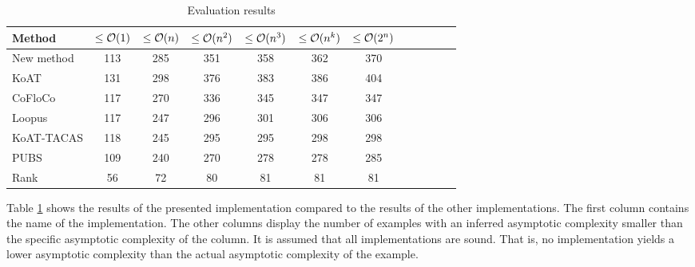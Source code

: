 \begin{table}
  \begin{center}
    \label{tab:evaluation}
    \begin{tabular}{l|c|c|c|c|c|c|c|c|c|c|c}
      Method & $\leq\mathcal{O}(1)$ & $\leq\mathcal{O}(n)$ & $\leq\mathcal{O}(n^2)$ & $\leq\mathcal{O}(n^3)$ & $\leq\mathcal{O}(n^k)$ & $\leq\mathcal{O}(2^n)$\\
      \hline
      New method & 113 & 285 & 351 & 358 & 362 & 370 \\
      KoAT       & 131 & 298 & 376 & 383 & 386 & 404 \\
      CoFloCo    & 117 & 270 & 336 & 345 & 347 & 347 \\
      Loopus     & 117 & 247 & 296 & 301 & 306 & 306 \\
      KoAT-TACAS & 118 & 245 & 295 & 295 & 298 & 298 \\
      PUBS       & 109 & 240 & 270 & 278 & 278 & 285 \\
      Rank       & 56  &  72 &  80 &  81 &  81 &  81 \\
    \end{tabular}
  \end{center}
  \caption{Evaluation results}
\end{table}

Table \ref{tab:evaluation} shows the results of the presented implementation compared to the results of the other implementations.
The first column contains the name of the implementation.
The other columns display the number of examples with an inferred asymptotic complexity smaller than the specific asymptotic complexity of the column.
It is assumed that all implementations are sound.
That is, no implementation yields a lower asymptotic complexity than the actual asymptotic complexity of the example.

